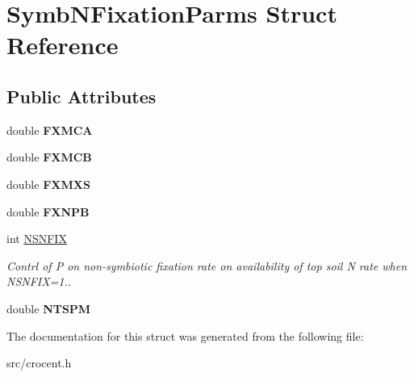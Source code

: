 \hypertarget{struct_symb_n_fixation_parms}{\section{Symb\-N\-Fixation\-Parms Struct Reference}
\label{struct_symb_n_fixation_parms}
}
\subsection*{Public Attributes}
\begin{DoxyCompactItemize}
\item 
\hypertarget{struct_symb_n_fixation_parms_a5d0d60ad4d1f725e12f6673c307a481a}{double {\bfseries F\-X\-M\-C\-A}}\label{struct_symb_n_fixation_parms_a5d0d60ad4d1f725e12f6673c307a481a}

\item 
\hypertarget{struct_symb_n_fixation_parms_ab4b6e670f6d9fcb375d49794d52898ae}{double {\bfseries F\-X\-M\-C\-B}}\label{struct_symb_n_fixation_parms_ab4b6e670f6d9fcb375d49794d52898ae}

\item 
\hypertarget{struct_symb_n_fixation_parms_a9f4e4b9282ed9e5be09facc8891fb120}{double {\bfseries F\-X\-M\-X\-S}}\label{struct_symb_n_fixation_parms_a9f4e4b9282ed9e5be09facc8891fb120}

\item 
\hypertarget{struct_symb_n_fixation_parms_ac5eec2dd88ba1d4809b9ce22623db002}{double {\bfseries F\-X\-N\-P\-B}}\label{struct_symb_n_fixation_parms_ac5eec2dd88ba1d4809b9ce22623db002}

\item 
\hypertarget{struct_symb_n_fixation_parms_a5451926c12e7179db8826f315d7cdfc6}{int \hyperlink{struct_symb_n_fixation_parms_a5451926c12e7179db8826f315d7cdfc6}{N\-S\-N\-F\-I\-X}}\label{struct_symb_n_fixation_parms_a5451926c12e7179db8826f315d7cdfc6}

\begin{DoxyCompactList}\small\item\em Contrl of P on non-\/symbiotic fixation rate on availability of top soil N rate when N\-S\-N\-F\-I\-X=1.. \end{DoxyCompactList}\item 
\hypertarget{struct_symb_n_fixation_parms_ad67327a3cd28df6bfb3ab85b4968ada9}{double {\bfseries N\-T\-S\-P\-M}}\label{struct_symb_n_fixation_parms_ad67327a3cd28df6bfb3ab85b4968ada9}

\end{DoxyCompactItemize}


The documentation for this struct was generated from the following file\-:\begin{DoxyCompactItemize}
\item 
src/crocent.\-h\end{DoxyCompactItemize}
